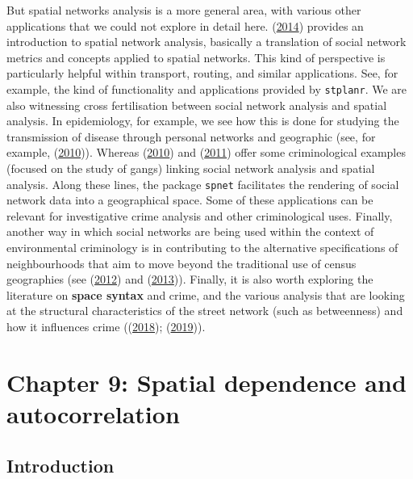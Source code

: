 \documentclass[
  krantz2]{krantz}
\begin{document}
But spatial networks analysis is a more general area, with various other applications that we could not explore in detail here. (\protect\hyperlink{ref-OSullivan_2014}{2014}) provides an introduction to spatial network analysis, basically a translation of social network metrics and concepts applied to spatial networks. This kind of perspective is particularly helpful within transport, routing, and similar applications. See, for example, the kind of functionality and applications provided by \texttt{stplanr}. We are also witnessing cross fertilisation between social network analysis and spatial analysis. In epidemiology, for example, we see how this is done for studying the transmission of disease through personal networks and geographic (see, for example, (\protect\hyperlink{ref-Emch_2010}{2010})). Whereas (\protect\hyperlink{ref-Radil_2010}{2010}) and (\protect\hyperlink{ref-Tita_2011}{2011}) offer some criminological examples (focused on the study of gangs) linking social network analysis and spatial analysis. Along these lines, the package \texttt{spnet} facilitates the rendering of social network data into a geographical space. Some of these applications can be relevant for investigative crime analysis and other criminological uses. Finally, another way in which social networks are being used within the context of environmental criminology is in contributing to the alternative specifications of neighbourhoods that aim to move beyond the traditional use of census geographies (see (\protect\hyperlink{ref-Hipp_2012}{2012}) and (\protect\hyperlink{ref-Hipp_2013}{2013})). Finally, it is also worth exploring the literature on \textbf{space syntax} and crime, and the various analysis that are looking at the structural characteristics of the street network (such as betweenness) and how it influences crime ((\protect\hyperlink{ref-Davies_2018}{2018}); (\protect\hyperlink{ref-Kim_2019}{2019})).

\hypertarget{chapter-9-spatial-dependence-and-autocorrelation}{%
\chapter{Chapter 9: Spatial dependence and autocorrelation}\label{chapter-9-spatial-dependence-and-autocorrelation}}

\hypertarget{introduction-7}{%
\section{Introduction}\label{introduction-7}}
\end{document}

